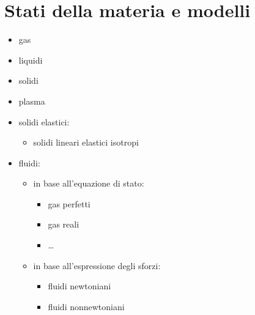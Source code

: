 \documentclass[letterpaper,10pt,english]{jupyterBook}
\begin{document}
\chapter{Stati della materia e modelli}
\label{\detokenize{ch/media:stati-della-materia-e-modelli}}\label{\detokenize{ch/media:classical-thermodynamics-media}}\label{\detokenize{ch/media::doc}}
\sphinxAtStartPar
{}
\begin{itemize}
\item {} 
\sphinxAtStartPar
gas

\item {} 
\sphinxAtStartPar
liquidi

\item {} 
\sphinxAtStartPar
solidi

\item {} 
\sphinxAtStartPar
plasma

\end{itemize}

\sphinxAtStartPar
{}
\begin{itemize}
\item {} 
\sphinxAtStartPar
solidi elastici:
\begin{itemize}
\item {} 
\sphinxAtStartPar
solidi lineari elastici isotropi

\end{itemize}

\item {} 
\sphinxAtStartPar
fluidi:
\begin{itemize}
\item {} 
\sphinxAtStartPar
in base all’equazione di stato:
\begin{itemize}
\item {} 
\sphinxAtStartPar
gas perfetti

\item {} 
\sphinxAtStartPar
gas reali

\item {} 
\sphinxAtStartPar
…

\end{itemize}

\item {} 
\sphinxAtStartPar
in base all’espressione degli sforzi:
\begin{itemize}
\item {} 
\sphinxAtStartPar
fluidi newtoniani

\item {} 
\sphinxAtStartPar
fluidi non\sphinxhyphen{}newtoniani

\end{itemize}

\end{itemize}

\end{itemize}
\end{document}

